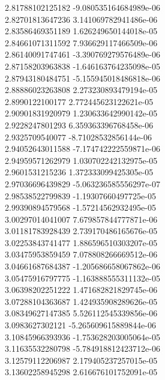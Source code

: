 {2.81788102125182 -9.080535164684989e-06 \\
2.82701813647236 3.141069782941486e-06 \\
2.83586469351189 1.626249650144018e-05 \\
2.84661071311592 7.936629117466509e-06 \\
2.86140091747461 -3.390769279576489e-06 \\
2.87158203963838 -1.646163764235098e-05 \\
2.87943180484751 -5.155945018486818e-06 \\
2.88886023263808 2.273230893479194e-05 \\
2.8990122100177 2.772445623122621e-05 \\
2.90901831920979 1.230633642990142e-05 \\
2.9228247801293 6.359363396768458e-06 \\
2.9325709540077 -8.71028532856144e-06 \\
2.94052643011588 -7.174742222559871e-06 \\
2.94959571262979 1.030702242132975e-05 \\
2.9601531215236 1.372333099425305e-05 \\
2.97036696439829 -5.063236585556297e-07 \\
2.98538522799839 -1.19307660497725e-05 \\
2.99390894579568 -1.57214562932495e-05 \\
3.00297014041007 7.679857844777871e-06 \\
3.01181783928439 2.739170486165676e-05 \\
3.02253843741477 1.886596510303207e-05 \\
3.03475953859459 7.078808266669512e-06 \\
3.04661687684387 -1.205686658067862e-06 \\
3.05475916797775 -1.163888555311132e-05 \\
3.06398202251222 1.471682821829745e-06 \\
3.07288104363687 1.424935908289626e-05 \\
3.08349627147385 5.526112545339856e-06 \\
3.0983627302121 -5.265609615889844e-06 \\
3.10845966393936 -1.753628203005064e-05 \\
3.11635532280798 -5.784918812423712e-06 \\
3.12579112206987 2.179405237257015e-05 \\
3.13602258945298 2.616676101752091e-05 \\
}
